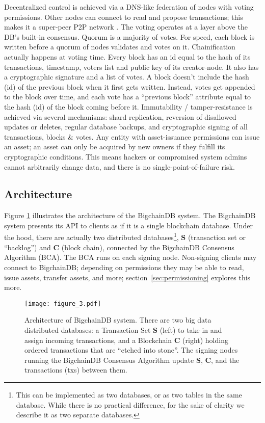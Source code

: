 Decentralized control is achieved via a DNS-like federation of nodes with voting permissions.
Other nodes can connect to read and propose transactions; this makes it a super-peer P2P network \cite{ozsu2011principles}.
The voting operates at a layer above the DB’s built-in consensus.
Quorum is a majority of votes.
For speed, each block is written before a quorum of nodes validates and votes on it.
Chainification actually happens at voting time.
Every block has an id equal to the hash of its transactions, timestamp, voters list and public key of its creator-node. It also has a cryptographic signature and a list of votes.
A block doesn't include the hash (id) of the previous block when it first gets written.
Instead, votes get appended to the block over time, and each vote has a ``previous block'' attribute equal to the hash (id) of the block coming before it.
Immutability / tamper-resistance is achieved via several mechanisms: shard replication, reversion of disallowed updates or deletes, regular database backups, and cryptographic signing of all transactions, blocks \& votes.
Any entity with asset-issuance permissions can issue an asset; an asset can only be acquired by new owners if they fulfill its cryptographic conditions.
This means hackers or compromised system admins cannot arbitrarily change data, and there is no single-point-of-failure risk.

\subsection{Architecture}
Figure \ref{fig:bigchaindb_architecture} illustrates the architecture of the BigchainDB system.
The BigchainDB system presents its API to clients as if it is a single blockchain database.
Under the hood, there are actually two distributed databases\footnote{This can be implemented as two databases, or as two tables in the same database. While there is no practical difference, for the sake of clarity we describe it as two separate databases.}, $\mathbf{S}$ (transaction set or “backlog”) and $\mathbf{C}$ (block chain), connected by the BigchainDB Consensus Algorithm (BCA).
The BCA runs on each signing node.
Non-signing clients may connect to BigchainDB; depending on permissions they may be able to read, issue assets, transfer assets, and more; section~\ref{sec:permissioning} explores this more.

\begin{figure}[!ht]
  \centering
  \texttt{[image: figure\_3.pdf]}
  \caption{Architecture of BigchainDB system.
  There are two big data distributed databases: a Transaction Set $\mathbf{S}$ (left) to take in and assign incoming transactions, and a Blockchain $\mathbf{C}$ (right) holding ordered transactions that are “etched into stone”.
  The signing nodes running the BigchainDB Consensus Algorithm update $\mathbf{S}$, $\mathbf{C}$, and the transactions (txs) between them.}
  \label{fig:bigchaindb_architecture}
\end{figure}

